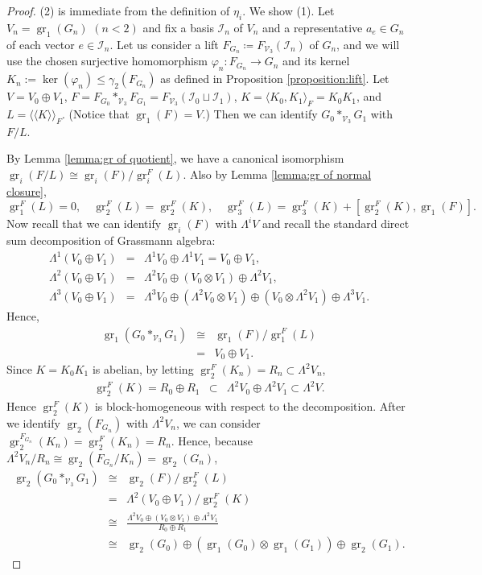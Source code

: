 \documentclass[11pt,reqno]{article}
\theoremstyle{definition}
\theoremstyle{remark}
\DeclareMathOperator{\gr}{gr}
\newcommand{\llangle}{\langle\!\langle}
\newcommand{\rrangle}{\rangle\!\rangle}
\begin{document}
\begin{proof}
(2) is immediate from the definition of $\eta_i$.
We show (1).
Let $V_n=\gr_1(G_n)$ $(n<2)$ and fix a basis $\mathcal I_n$ of $V_n$ and a representative $a_e\in G_n$ of each vector $e\in \mathcal I_n$.
Let us consider a lift $F_{G_n}\coloneqq F_{\mathcal V_3}(\mathcal I_n)$ of $G_n$, and we will use the
chosen surjective homomorphism $\varphi_n:F_{G_n}\to G_n$ and its kernel
$K_n:=\ker(\varphi_n)\leq\gamma_2(F_{G_n})$ as defined in Proposition \ref{proposition:lift}.
Let $V=V_0\oplus V_1$, $F=F_{G_0}*_{\mathcal V_3} F_{G_1}=F_{\mathcal V_3}(\mathcal I_0\sqcup \mathcal I_1)$, $K=\langle K_0,K_1\rangle_F=K_0K_1$, and $L=\llangle K\rrangle_F$.
(Notice that $\gr_1(F)=V$.)
Then we can identify $G_0*_{\mathcal V_3}G_1$ with $F/L$.

By Lemma \ref{lemma:gr of quotient}, we have a canonical isomorphism $\gr_i(F/L)\cong \gr_i(F)/\gr_i^F(L)$.
Also by Lemma \ref{lemma:gr of normal closure}, 
\[
    \gr_1^F(L)=0, \quad \gr_2^F(L)=\gr_2^F(K), \quad \gr_3^F(L)=\gr_3^F(K)+[\gr_2^F(K),\gr_1(F)].
\]
Now recall that we can identify $\gr_i(F)$ with $\Lambda^i V$ and recall the standard direct sum decomposition of Grassmann algebra:
\begin{eqnarray*}
    \Lambda^1(V_0\oplus V_1)&=&\Lambda^1V_0 \oplus \Lambda^1 V_1 = V_0\oplus V_1,\\ 
    \Lambda^2(V_0\oplus V_1)&=&\Lambda^2V_0 \oplus (V_0\otimes V_1)\oplus\Lambda^2 V_1,\\ 
    \Lambda^3(V_0\oplus V_1)&=&\Lambda^3V_0 \oplus (\Lambda^2V_0\otimes V_1) \oplus (V_0\otimes \Lambda^2V_1)\oplus\Lambda^3 V_1.    
\end{eqnarray*}
Hence,
\begin{eqnarray*}
    \gr_1(G_0*_{\mathcal V_3}G_1) 
    &\cong& \gr_1(F)/\gr_1^F(L)\\ 
    &=& V_{0}\oplus V_{1}.
\end{eqnarray*}
Since $K=K_0K_1$ is abelian, by letting $\gr_2^F(K_n)=R_n\subset \Lambda^2 V_n$,
\begin{eqnarray*}
    \gr_2^F(K)=R_0\oplus R_1 &\subset& \Lambda^2 V_0\oplus \Lambda^2 V_1\subset \Lambda^2 V.
\end{eqnarray*}
Hence $\gr_2^F(K)$ is block-homogeneous with respect to the decomposition.
After we identify $\gr_2(F_{G_n})$ with $\Lambda^2 V_n$, we can consider $\gr_2^{F_{G_n}}(K_n)=\gr_2^F(K_n)=R_n$.
Hence, because $\Lambda^2V_n/R_n \cong \gr_2(F_{G_n}/K_n)=\gr_2(G_n)$,
\begin{eqnarray*}
    \gr_2(G_0*_{\mathcal V_3}G_1) 
    &\cong& \gr_2(F)/\gr_2^F(L)\\ 
    &=& \Lambda^2(V_0\oplus V_1)/\gr_2^F(K)\\ 
    &\cong& \frac{\Lambda^2V_0\oplus (V_0\otimes V_1)\oplus \Lambda^2V_1}{R_0\oplus R_1}\\ 
    &\cong& \gr_2(G_0) \oplus (\gr_1(G_0)\otimes \gr_1(G_1))\oplus \gr_2(G_1).
\end{eqnarray*}


\end{proof}
\end{document}

